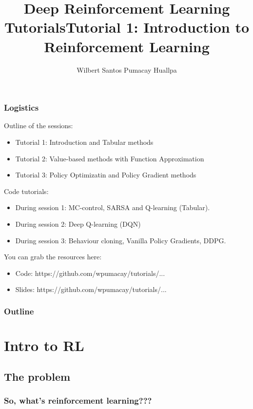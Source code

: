 \documentclass{beamer}
\title{Deep Reinforcement Learning Tutorials}
\author{Wilbert Santos Pumacay Huallpa}
\begin{document}
\begin{frame}
    \titlepage
\end{frame}

\begin{frame}
    \frametitle{Logistics}
    Outline of the sessions:
    \begin{itemize}
        \item Tutorial 1: Introduction and Tabular methods
        \item Tutorial 2: Value-based methods with Function Approximation
        \item Tutorial 3: Policy Optimizatin and Policy Gradient methods
    \end{itemize}

    \pause

    Code tutorials:
    \begin{itemize}
        \item During session 1: MC-control, SARSA and Q-learning (Tabular).
        \item During session 2: Deep Q-learning (DQN)
        \item During session 3: Behaviour cloning, Vanilla Policy Gradients, DDPG.
    \end{itemize}

    \pause

    You can grab the resources here:
    \begin{itemize}
        \item Code: https://github.com/wpumacay/tutorials/...
        \item Slides: https://github.com/wpumacay/tutorials/...
    \end{itemize}
\end{frame}

\title{Tutorial 1: Introduction to Reinforcement Learning}
\author{}
\date{}

\begin{frame}
    \titlepage
\end{frame}

\begin{frame}
    \frametitle{Outline}
    \tableofcontents
\end{frame}

\section{Intro to RL}
\subsection{The problem}
\begin{frame}
    \frametitle{So, what's reinforcement learning???}
\end{frame}
\end{document}
